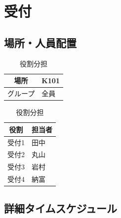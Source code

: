 \section{受付}  %

\subsection{場所・人員配置}
\begin{table}[h]
  \centering
  \begin{minipage}[t]{0.48\columnwidth}
    \centering
    \caption{場所・該当グループ}
    \begin{tabular}{cl}
      \hline
      場所 & K101 \\
      \hline
      グループ & 全員 \\
      \hline
    \end{tabular}
  \end{minipage}
  \begin{minipage}[t]{0.48\columnwidth}
    \centering
    \caption{役割分担}
    \begin{tabular}{ll}
      \hline
      \multicolumn{1}{c}{役割} & \multicolumn{1}{c}{担当者} \\
      \hline
      受付1 & 田中 \\
      受付2 & 丸山 \\
      受付3 & 岩村 \\
      受付4 & 納富 \\
      \hline
    \end{tabular}
  \end{minipage}
\end{table}

\subsection{詳細タイムスケジュール}
\vspace{0.5em}
\fontsize{8pt}{12pt}\selectfont

